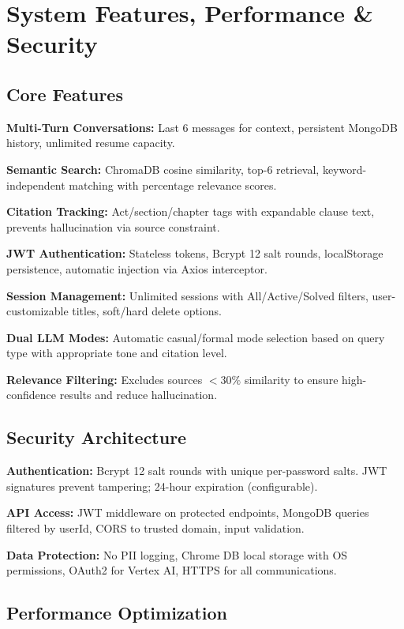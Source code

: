 \documentclass[12pt,a4paper]{article}
\begin{document}
\section{System Features, Performance \& Security}

\subsection{Core Features}

\textbf{Multi-Turn Conversations:} Last 6 messages for context, persistent MongoDB history, unlimited resume capacity.

\textbf{Semantic Search:} ChromaDB cosine similarity, top-6 retrieval, keyword-independent matching with percentage relevance scores.

\textbf{Citation Tracking:} Act/section/chapter tags with expandable clause text, prevents hallucination via source constraint.

\textbf{JWT Authentication:} Stateless tokens, Bcrypt 12 salt rounds, localStorage persistence, automatic injection via Axios interceptor.

\textbf{Session Management:} Unlimited sessions with All/Active/Solved filters, user-customizable titles, soft/hard delete options.

\textbf{Dual LLM Modes:} Automatic casual/formal mode selection based on query type with appropriate tone and citation level.

\textbf{Relevance Filtering:} Excludes sources $<30\%$ similarity to ensure high-confidence results and reduce hallucination.

\subsection{Security Architecture}

\textbf{Authentication:} Bcrypt 12 salt rounds with unique per-password salts. JWT signatures prevent tampering; 24-hour expiration (configurable).

\textbf{API Access:} JWT middleware on protected endpoints, MongoDB queries filtered by userId, CORS to trusted domain, input validation.

\textbf{Data Protection:} No PII logging, Chrome DB local storage with OS permissions, OAuth2 for Vertex AI, HTTPS for all communications.

\subsection{Performance Optimization}
\end{document}
